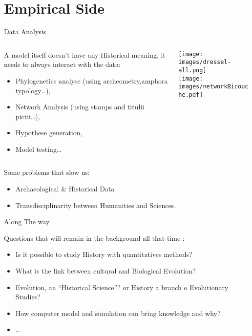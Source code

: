 \documentclass[8pt, handout=show,notes=show]{beamer}
\begin{document}
\section{Empirical Side}

\begin{frame}{Data Analysis}
    \begin{columns}
	\begin{column}{.6\textwidth}
    	A model itself doesn't have any Historical meaning, it needs to always interact with the data:  
	    \begin{itemize}
		\item Phylogenetics analyse (using archeometry,amphora typology\ldots),
		\item Network Analysis (using stamps and titulii pictii\ldots),
		\item Hypothese generation,
		\item Model testing\ldots
	    \end{itemize}
	\end{column}
	\begin{column}{.4\textwidth}
	    \texttt{[image: images/dressel-all.png]}\\
	    \texttt{[image: images/networkBicouche.pdf]}
	    
	\end{column}
    \end{columns}

    
    \begin{alertblock}
	{Some problems that slow us:}
	\begin{itemize}
	    \item Archaeological \& Historical Data
	    \item Transdisciplinarity between Humanities and Sciences.
	\end{itemize}
    \end{alertblock}

\end{frame}
\begin{frame}{Along The way}

    Questions that will remain in the background all that time :

    \begin{itemize}
	\item Is it possible to study History with quantitatives methods?
	\item What is the link between cultural and Biological Evolution?
	\item Evolution, an ``Historical Science''? or History a branch o Evolutionary Studies? 
	\item How computer model and simulation can bring knowledge and why?
	\item \ldots
    \end{itemize}
    
\end{frame}
\end{document}
